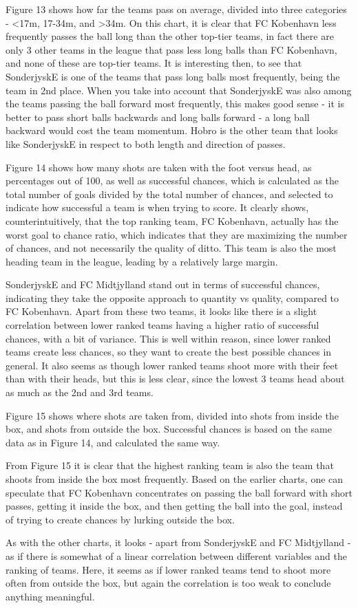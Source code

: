 \documentclass[Report.tex]{subfiles}
\begin{document}
Figure 13 shows how far the teams pass on average, divided into three
categories - <17m, 17-34m, and >34m. 
On this chart, it is clear that FC Kobenhavn less frequently passes the ball
long than the other top-tier teams, in fact there are only 3 other teams in the
league that pass less long balls than FC Kobenhavn, and none of these are
top-tier teams. It is interesting then, to see that SonderjyskE is one of the
teams that pass long balls most frequently, being the team in 2nd place. When
you take into account that SonderjyskE was also among the teams passing the ball
forward most frequently, this makes good sense - it is better to pass short
balls backwards and long balls forward - a long ball backward would cost the
team momentum. Hobro is the other team that looks like SonderjyskE in respect to
both length and direction of passes. 

Figure 14 shows how many shots are taken with the foot versus head, as
percentages out of 100, as well as successful chances, which is calculated as
the total number of goals divided by the total number of chances, and selected
to indicate how successful a team is when trying to score. 
It clearly shows, counterintuitively, that the top ranking team, FC Kobenhavn,
actually has the worst goal to chance ratio, which indicates that they are
maximizing the number of chances, and not necessarily the quality of ditto. This
team is also the most heading team in the league, leading by a relatively large
margin. 

SonderjyskE and FC Midtjylland stand out in terms of successful chances,
indicating they take the opposite approach to quantity vs quality, compared to
FC Kobenhavn. Apart from these two teams, it looks like there is a slight
correlation between lower ranked teams having a higher ratio of successful
chances, with a bit of variance. This is well within reason, since lower ranked
teams create less chances, so they want to create the best possible chances in
general. It also seems as though lower ranked teams shoot more with their feet
than with their heads, but this is less clear, since the lowest 3 teams head
about as much as the 2nd and 3rd teams. 

Figure 15 shows where shots are taken from, divided into shots from inside the
box, and shots from outside the box. Successful chances is based on the same
data as in Figure 14, and calculated the same way. 

From Figure 15 it is clear that the highest ranking team is also the team that
shoots from inside the box most frequently. Based on the earlier charts, one can
speculate that FC Kobenhavn concentrates on passing the ball forward with short
passes, getting it inside the box, and then getting the ball into the goal,
instead of trying to create chances by lurking outside the box. 

As with the other charts, it looks - apart from SonderjyskE and FC Midtjylland -
as if there is somewhat of a linear correlation between different variables and
the ranking of teams. Here, it seems as if lower ranked teams tend to shoot more
often from outside the box, but again the correlation is too weak to conclude
anything meaningful. 
 
\end{document}
